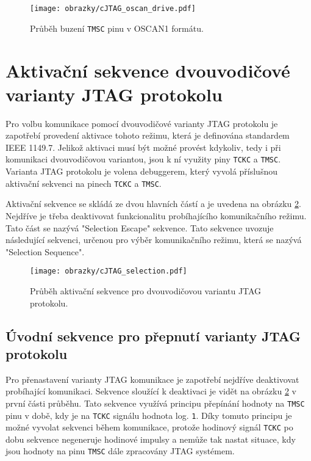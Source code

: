 \begin{figure}[!h]
  \begin{center}
    \texttt{[image: obrazky/cJTAG\_oscan\_drive.pdf]}
  \end{center}
  \caption{Průběh buzení \texttt{\acs{TMSC}} pinu v OSCAN1 formátu.}
	\label{fig:oscan_drive}
\end{figure}


\section{Aktivační sekvence dvouvodičové varianty \acs{JTAG} protokolu}
Pro volbu komunikace pomocí dvouvodičové varianty \acs{JTAG} protokolu je zapotřebí provedení aktivace tohoto režimu, která je definována standardem IEEE 1149.7. Jelikož aktivaci musí být možné provést kdykoliv, tedy i při komunikaci dvouvodičovou variantou, jsou k ní využity piny \texttt{\acs{TCKC}} a \texttt{\acs{TMSC}}. Varianta \acs{JTAG} protokolu je volena debuggerem, který vyvolá příslušnou aktivační sekvenci na pinech \texttt{\acs{TCKC}} a \texttt{\acs{TMSC}}. \cite{IEEE_1149-7}

Aktivační sekvence se skládá ze dvou hlavních částí a je uvedena na obrázku \ref{fig:cJTAG_sel}. Nejdříve je třeba deaktivovat funkcionalitu probíhajícího komunikačního režimu. Tato část se nazývá "Selection Escape" sekvence. Tato sekvence uvozuje následující sekvenci, určenou pro výběr komunikačního režimu, která se nazývá "Selection Sequence". \cite{IEEE_1149-7}

\begin{figure}[!h]
  \begin{center}
    \texttt{[image: obrazky/cJTAG\_selection.pdf]}
  \end{center}
  \caption{Průběh aktivační sekvence pro dvouvodičovou variantu \acs{JTAG} protokolu.}
	\label{fig:cJTAG_sel}
\end{figure}

\subsection{Úvodní sekvence pro přepnutí varianty \acs{JTAG} protokolu}	\label{subsec:sel_escape}
Pro přenastavení varianty \acs{JTAG} komunikace je zapotřebí nejdříve deaktivovat probíhající komunikaci. Sekvence sloužící k deaktivaci je vidět na obrázku \ref{fig:cJTAG_sel} v první části průběhu. Tato sekvence využívá principu přepínání hodnoty na \texttt{\acs{TMSC}} pinu v době, kdy je na \texttt{\acs{TCKC}} signálu hodnota log. \texttt{1}. Díky tomuto principu je možné vyvolat sekvenci během komunikace, protože hodinový signál \texttt{\acs{TCKC}} po dobu sekvence negeneruje hodinové impulsy a nemůže tak nastat situace, kdy jsou hodnoty na pinu \texttt{\acs{TMSC}} dále zpracovány \acs{JTAG} systémem. \cite{IEEE_1149-7}

